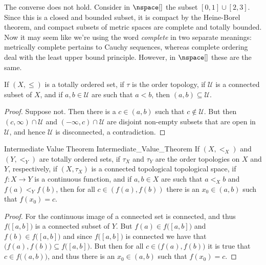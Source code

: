 \documentclass{article}                                                        %
\begin{document}
        The converse does not hold. Consider in $\nspace[]$ the subset
        $[0,1]\cup[2,3]$. Since this is a closed and bounded subset, it is
        compact by the Heine-Borel theorem, and compact subsets of metric spaces
        are complete and totally bounded. Now it may seem like we're using the
        word \textit{complete} in two separate meanings: metrically complete
        pertains to Cauchy sequences, whereas complete ordering deal with the
        least upper bound principle. However, in $\nspace[]$ these are the same.
        \begin{theorem}
                If $(X,\leq)$ is a totally ordered set, if $\tau$ is the order
                topology, if $\mathcal{U}$ is a connected subset of $X$, and if
                $a,b\in\mathcal{U}$ are such that $a<b$, then
                $(a,b)\subseteq\mathcal{U}$.
        \end{theorem}
        \begin{proof}
                Suppose not. Then there is a $c\in(a,b)$ such that
                $c\notin\mathcal{U}$. But then $(c,\infty)\cap\mathcal{U}$ and
                $(\minus\infty,c)\cap\mathcal{U}$ are disjoint non-empty subsets
                that are open in $\mathcal{U}$, and hence $\mathcal{U}$ is
                disconnected, a contradiction.
        \end{proof}
        \begin{ltheorem}{Intermediate Value Theorem}
                            {Intermediate_Value_Theorem}
                If $(X,<_{X})$ and $(Y,<_{Y})$ are totally ordered sets, if
                $\tau_{X}$ and $\tau_{Y}$ are the order topologies on $X$ and
                $Y$, respectively, if $(X,\tau_{X})$ is a connected topological
                topological space, if $f:X\rightarrow{Y}$ is a continuous
                function, and if $a,b\in{X}$ are such that $a<_{X}b$ and
                $f(a)<_{Y}f(b)$, then for all $c\in(f(a),f(b))$ there is an
                $x_{0}\in(a,b)$ such that $f(x_{0})=c$.
        \end{ltheorem}
        \begin{proof}
                For the continuous image of a connected set is connected, and
                thus $f\big([a,b]\big)$ is a connected subset of $Y$. But
                $f(a)\in{f}\big([a,b]\big)$ and $f(b)\in{f}\big([a,b]\big)$ and
                since $f\big([a,b]\big)$ is connected we have that
                $\big(f(a),f(b)\big)\subseteq{f}\big([a,b]\big)$. But then for
                all $c\in\big(f(a),f(b)\big)$ it is true that
                $c\in{f}\big((a,b)\big)$, and thus there is an $x_{0}\in(a,b)$
                such that $f(x_{0})=c$.
        \end{proof}
\end{document}
